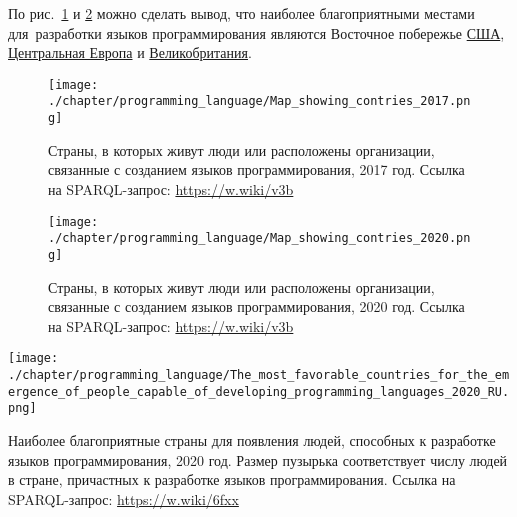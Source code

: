 По рис.~\ref{fig:countries_2017} и \ref{fig:countries_2020} можно сделать вывод, 
что наиболее благоприятными местами для~разработки языков программирования являются 
Восточное побережье \href{https://en.wikipedia.org/wiki/USA}{США}, 
\href{https://ru.wikipedia.org/wiki/Центральная_Европа}{Центральная Европа} и 
\href{https://ru.wikipedia.org/wiki/Великобритания}{Великобритания}.


\begin{figure}[h]
\centering
	\texttt{[image: ./chapter/programming\_language/Map\_showing\_contries\_2017.png]}
	\caption[Страны, в которых живут люди или расположены организации, связанные с созданием языков программирования, 2017 год.]{Страны, в которых живут люди или расположены организации, связанные с созданием языков программирования, 2017 год. Ссылка на SPARQL-запрос: \href{https://w.wiki/v3b}{https://w.wiki/v3b}}
	\label{fig:countries_2017}
\end{figure}
\begin{figure}
\centering
	\texttt{[image: ./chapter/programming\_language/Map\_showing\_contries\_2020.png]}
	\caption[Страны, в которых живут люди или расположены организации, связанные с созданием языков программирования, 2020 год.]{Страны, в которых живут люди или расположены организации, связанные с созданием языков программирования, 2020 год. Ссылка на SPARQL-запрос: \href{https://w.wiki/v3b}{https://w.wiki/v3b}}
	\label{fig:countries_2020}
\end{figure}

\begin{marginfigure}
\texttt{[image: ./chapter/programming\_language/The\_most\_favorable\_countries\_for\_the\_emergence\_of\_people\_capable\_of\_developing\_programming\_languages\_2020\_RU.png]}
  \caption[Наиболее благоприятные страны для разработчиков языков программирования, 2020 год.]{Наиболее благоприятные страны для появления людей, способных к разработке языков программирования, 2020 год. Размер пузырька соответствует числу людей в стране, причастных к разработке языков программирования. Ссылка на SPARQL-запрос: \href{https://w.wiki/6fxx}{https://w.wiki/6fxx}}%
  \label{fig:countries_2_2020}%
\end{marginfigure}



